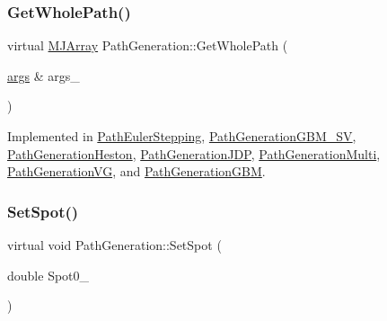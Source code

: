 \hypertarget{classPathGeneration_ace7520fed7b6a7711f4d3684c974cb76}{}\label{classPathGeneration_ace7520fed7b6a7711f4d3684c974cb76} 
\subsubsection{\texorpdfstring{Get\+Whole\+Path()}{GetWholePath()}}
{\footnotesize\ttfamily virtual \hyperlink{classMJArray}{M\+J\+Array} Path\+Generation\+::\+Get\+Whole\+Path (\begin{DoxyParamCaption}\item[{\hyperlink{path__generation_8h_a75c13cde2074f502cc4348c70528572d}{args} \&}]{args\+\_\+ }\end{DoxyParamCaption})\hspace{0.3cm}{\ttfamily [pure virtual]}}



Implemented in \hyperlink{classPathEulerStepping_afb4f8e7ce3c81671111486c0fa92a9d2}{Path\+Euler\+Stepping}, \hyperlink{classPathGenerationGBM__SV_abb36f42991ec304d6efeaf772b8367c1}{Path\+Generation\+G\+B\+M\+\_\+\+SV}, \hyperlink{classPathGenerationHeston_a2916170a243c003fb8362c13def63483}{Path\+Generation\+Heston}, \hyperlink{classPathGenerationJDP_a6bd084a32f7ad0a65039f1e77c1d428e}{Path\+Generation\+J\+DP}, \hyperlink{classPathGenerationMulti_ab47e41a3cc266a81ac1770868b5ac7ca}{Path\+Generation\+Multi}, \hyperlink{classPathGenerationVG_a298f0f8b2b11e912558044a8a2b5d8e9}{Path\+Generation\+VG}, and \hyperlink{classPathGenerationGBM_abcf6790de9e9b4deef334653409a5c3f}{Path\+Generation\+G\+BM}.

\hypertarget{classPathGeneration_a5e3349bb16f3d5eb0a3d059572bfe3c8}{}\label{classPathGeneration_a5e3349bb16f3d5eb0a3d059572bfe3c8} 
\subsubsection{\texorpdfstring{Set\+Spot()}{SetSpot()}}
{\footnotesize\ttfamily virtual void Path\+Generation\+::\+Set\+Spot (\begin{DoxyParamCaption}\item[{double}]{Spot0\+\_\+ }\end{DoxyParamCaption})\hspace{0.3cm}{\ttfamily [virtual]}}

